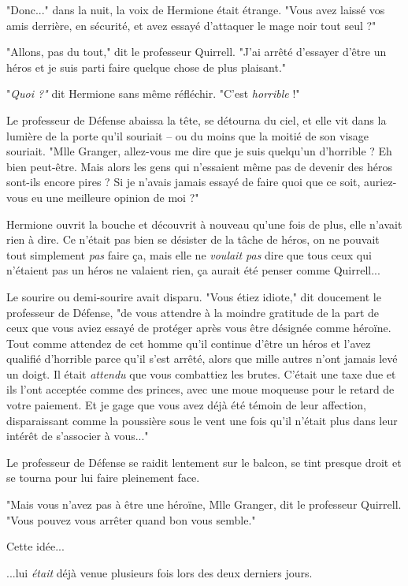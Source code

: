 "Donc..." dans la nuit, la voix de Hermione était étrange. "Vous avez laissé vos amis derrière, en sécurité, et avez essayé d'attaquer le mage noir tout seul ?"

"Allons, pas du tout," dit le professeur Quirrell. "J'ai arrêté d'essayer d'être un héros et je suis parti faire quelque chose de plus plaisant."

"\emph{Quoi ?"}  dit Hermione sans même réfléchir. "C'est \emph{horrible } !"

Le professeur de Défense abaissa la tête, se détourna du ciel, et elle vit dans la lumière de la porte qu'il souriait – ou du moins que la moitié de son visage souriait. "Mlle Granger, allez-vous me dire que je suis quelqu'un d'horrible ? Eh bien peut-être. Mais alors les gens qui n'essaient même pas de devenir des héros sont-ils encore pires ? Si je n'avais jamais essayé de faire quoi que ce soit, auriez-vous eu une meilleure opinion de moi ?"

Hermione ouvrit la bouche et découvrit à nouveau qu'une fois de plus, elle n'avait rien à dire. Ce n'était pas bien se désister de la tâche de héros, on ne pouvait tout simplement \emph{pas}  faire ça, mais elle ne \emph{voulait pas}  dire que tous ceux qui n'étaient pas un héros ne valaient rien, ça aurait été penser comme Quirrell...

Le sourire ou demi-sourire avait disparu. "Vous étiez idiote," dit doucement le professeur de Défense, "de vous attendre à la moindre gratitude de la part de ceux que vous aviez essayé de protéger après vous être désignée comme héroïne. Tout comme attendez de cet homme qu'il continue d'être un héros et l'avez qualifié d'horrible parce qu'il s'est arrêté, alors que mille autres n'ont jamais levé un doigt. Il était \emph{attendu}  que vous combattiez les brutes. C'était une taxe due et ils l'ont acceptée comme des princes, avec une moue moqueuse pour le retard de votre paiement. Et je gage que vous avez déjà été témoin de leur affection, disparaissant comme la poussière sous le vent une fois qu'il n'était plus dans leur intérêt de s'associer à vous..."

Le professeur de Défense se raidit lentement sur le balcon, se tint presque droit et se tourna pour lui faire pleinement face.

"Mais vous n'avez pas à être une héroïne, Mlle Granger, dit le professeur Quirrell. "Vous pouvez vous arrêter quand bon vous semble."

Cette idée...

...lui \emph{était}  déjà venue plusieurs fois lors des deux derniers jours.

